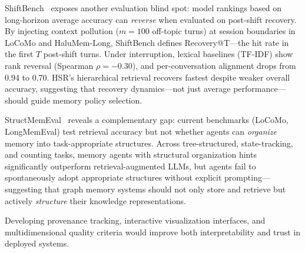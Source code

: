 \documentclass[hf]{ceurart}
\begin{document}
ShiftBench~\cite{shiftbench2026} exposes another evaluation blind
spot: model rankings based on long-horizon average accuracy can
\emph{reverse} when evaluated on post-shift recovery. By injecting
context pollution ($m{=}100$ off-topic turns) at session boundaries
in LoCoMo and HaluMem-Long, ShiftBench defines Recovery@T---the
hit rate in the first $T$ post-shift turns. Under interruption,
lexical baselines (TF-IDF) show rank reversal (Spearman $\rho =
-0.30$), and per-conversation alignment drops from 0.94 to 0.70.
HSR's hierarchical retrieval recovers fastest despite weaker overall
accuracy, suggesting that recovery dynamics---not just average
performance---should guide memory policy selection.

StructMemEval~\cite{structmemeval2026} reveals a complementary gap:
current benchmarks (LoCoMo, LongMemEval) test retrieval accuracy
but not whether agents can \emph{organize} memory into task-appropriate
structures. Across tree-structured, state-tracking, and counting tasks,
memory agents with structural organization hints significantly
outperform retrieval-augmented LLMs, but agents fail to spontaneously
adopt appropriate structures without explicit prompting---suggesting
that graph memory systems should not only store and retrieve but
actively \emph{structure} their knowledge representations.

Developing provenance tracking, interactive visualization interfaces,
and multidimensional quality criteria would improve both
interpretability and trust in deployed systems.
\end{document}
